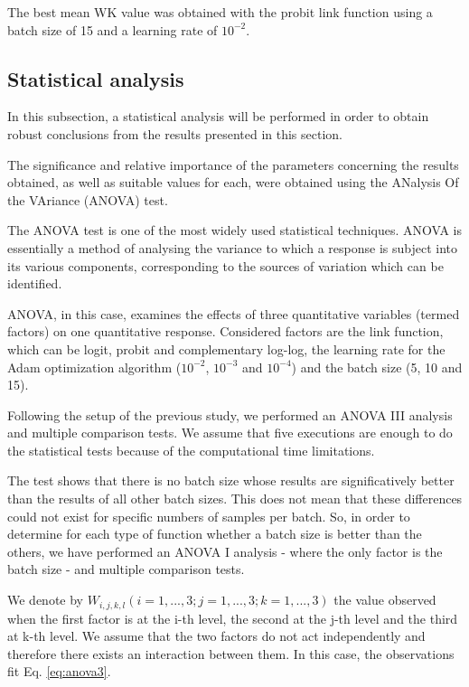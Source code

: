 \documentclass[10pt, a4paper, titlepage, twocolumn]{article}
\begin{document}
	The best mean WK value was obtained with the probit link function using a batch size of 15 and a learning rate of $10^{-2}$.
	
	\subsection{Statistical analysis}
	\label{sect:statisticalanalysis}
	In this subsection, a statistical analysis will be performed in order to obtain robust conclusions from the results presented in this section.
	
	The significance and relative importance of the parameters concerning the results obtained, as well as suitable values for each, were obtained using the ANalysis Of the VAriance (ANOVA) test.
	
	The ANOVA test \cite{miller1997beyond} is one of the most widely used statistical techniques. ANOVA is essentially a method of analysing the variance to which a response is subject into its various components, corresponding to the sources of variation which can be identified.
	
	ANOVA, in this case, examines the effects of three quantitative variables (termed factors) on one quantitative response. Considered factors are the link function, which can be logit, probit and complementary log-log, the learning rate for the Adam optimization algorithm ($10^{-2}$, $10^{-3}$ and $10^{-4}$) and the batch size (5, 10 and 15).
	
	Following the setup of the previous study, we performed an ANOVA III analysis and multiple comparison tests. We assume that five executions are enough to do the statistical tests because of the computational time limitations.
	
	The test shows that there is no batch size whose results are significatively better than the results of all other batch sizes. This does not mean that these differences could not exist for specific numbers of samples per batch. So, in order to determine for each type of function whether a batch size is better than the others, we have performed an ANOVA I analysis - where the only factor is the batch size - and multiple comparison tests.
	
	We denote by $W_{i,j,k,l}(i=1, ..., 3; j = 1, ..., 3; k = 1, ..., 3)$ the value observed when the first factor is at the i-th level, the second at the j-th level and the third at k-th level. We assume that the two factors do not act independently and therefore there exists an interaction between them. In this case, the observations fit Eq. \ref{eq:anova3}.
	
\end{document}

